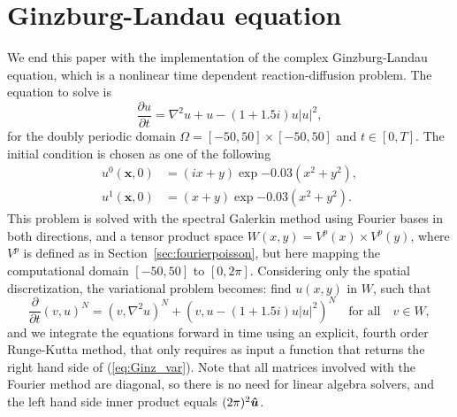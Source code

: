 \documentclass[%
oneside,                 %
final,                   %
10pt]{article}
\begin{document}
\section{Ginzburg-Landau equation}
\label{sec:ginzburg}
We end this paper with the implementation of the complex Ginzburg-Landau equation, which is a  nonlinear time dependent reaction-diffusion problem. The equation to solve is 
\begin{equation}
\frac{\partial u}{\partial t} = \nabla^2u + u - (1 + 1.5i)u |u|^2,
\end{equation}
for the doubly periodic domain $\Omega = [-50, 50]\times [-50, 50]$ and  $t \in [0, T]$. The initial condition is chosen as one of the following
\begin{align}
u^0(\boldsymbol{x}, 0) &= (ix + y) \exp {-0.03 (x^2 + y^2)} \label{eq:initial_0}, \\
u^1(\boldsymbol{x}, 0) &= (x + y) \exp {-0.03 (x^2 + y^2)} \label{eq:initial_1}.
\end{align}
This problem is solved with the spectral Galerkin method using Fourier bases in both directions, and a tensor product space $W(x,y)=V^p(x) \times V^p(y)$, where $V^p$ is defined as in Section~\ref{sec:fourierpoisson}, but here mapping the computational domain $[-50, 50]$ to $[0, 2\pi]$. Considering only the spatial discretization, the variational problem becomes: find $u(x, y)$ in $W$, such that
\begin{equation}
\frac{\partial }{\partial t} (v, u)^N = (v, \nabla^2u)^N + (v, u - (1 + 1.5i)u |u|^2)^N \quad \text{for all} \quad v \in W, \label{eq:Ginz_var}
\end{equation}
and we integrate the equations forward in time using an explicit, fourth order Runge-Kutta method, that only requires as input a function that returns the right hand side of (\ref{eq:Ginz_var}). Note that all matrices involved with the Fourier method are diagonal, so there is no need for linear algebra solvers, and the left hand side inner product equals $(2 \pi)^2 \boldsymbol{\hat{u}}$.
\end{document}
